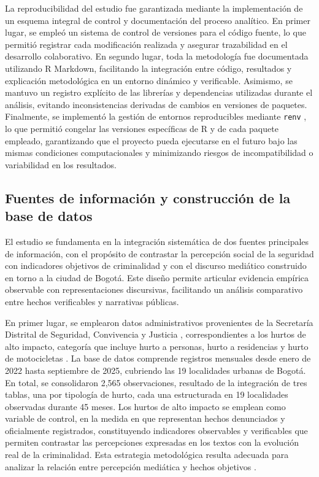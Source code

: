 \documentclass[sn-basic,pdflatex]{sn-jnl}
\theoremstyle{remark}
\theoremstyle{definition}
\begin{document}
La reproducibilidad del estudio fue garantizada mediante la
implementación de un esquema integral de control y documentación del
proceso analítico. En primer lugar, se empleó un sistema de control de
versiones para el código fuente, lo que permitió registrar cada
modificación realizada y asegurar trazabilidad en el desarrollo
colaborativo. En segundo lugar, toda la metodología fue documentada
utilizando R Markdown, facilitando la integración entre código,
resultados y explicación metodológica en un entorno dinámico y
verificable. Asimismo, se mantuvo un registro explícito de las librerías
y dependencias utilizadas durante el análisis, evitando inconsistencias
derivadas de cambios en versiones de paquetes. Finalmente, se implementó
la gestión de entornos reproducibles mediante \texttt{renv}
\citep{ushey2025}, lo que permitió congelar las versiones específicas de
R y de cada paquete empleado, garantizando que el proyecto pueda
ejecutarse en el futuro bajo las mismas condiciones computacionales y
minimizando riesgos de incompatibilidad o variabilidad en los
resultados.

\subsection{Fuentes de información y construcción de la base de
datos}\label{fuentes-de-informaciuxf3n-y-construcciuxf3n-de-la-base-de-datos}

El estudio se fundamenta en la integración sistemática de dos fuentes
principales de información, con el propósito de contrastar la percepción
social de la seguridad con indicadores objetivos de criminalidad y con
el discurso mediático construido en torno a la ciudad de Bogotá. Este
diseño permite articular evidencia empírica observable con
representaciones discursivas, facilitando un análisis comparativo entre
hechos verificables y narrativas públicas.

En primer lugar, se emplearon datos administrativos provenientes de la
Secretaría Distrital de Seguridad, Convivencia y Justicia
\citep{secretaria2026}, correspondientes a los hurtos de alto impacto,
categoría que incluye hurto a personas, hurto a residencias y hurto de
motocicletas \citep{anzola2019}. La base de datos comprende registros
mensuales desde enero de 2022 hasta septiembre de 2025, cubriendo las 19
localidades urbanas de Bogotá. En total, se consolidaron 2,565
observaciones, resultado de la integración de tres tablas, una por
tipología de hurto, cada una estructurada en 19 localidades observadas
durante 45 meses. Los hurtos de alto impacto se emplean como variable de
control, en la medida en que representan hechos denunciados y
oficialmente registrados, constituyendo indicadores observables y
verificables que permiten contrastar las percepciones expresadas en los
textos con la evolución real de la criminalidad. Esta estrategia
metodológica resulta adecuada para analizar la relación entre percepción
mediática y hechos objetivos \citep{lopezbalboa2021}.
\end{document}
